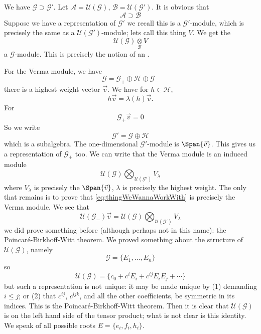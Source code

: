 We have $\mathscr{G}\supset\mathscr{G}'$. Let
$\mathscr{A}=\mathcal{U}(\mathscr{G})$,
$\mathscr{B}=\mathcal{U}(\mathscr{G}')$. It is obvious that
\begin{equation}
\mathscr{A}\supset\mathscr{B}
\end{equation}
Suppose we have a representation of $\mathscr{G}'$ we recall this
is a $\mathscr{G}'$-module, which is precisely the same as a
$\mathcal{U}(\mathscr{G}')$-module; lets call this thing $V$. We
get the
\begin{equation}
\mathcal{U}(\mathscr{G})\mathop{\otimes}\limits_{\mathscr{B}}V
\end{equation}
a $\mathscr{G}$-module. This is precisely the notion of an
.

For the Verma module, we have
\begin{equation}
\mathscr{G}=\mathscr{G}_{+}\oplus\mathscr{H}\oplus\mathscr{G}_{-}
\end{equation}
there is a highest weight vector $\vec{v}$. We have for
$h\in\mathscr{H}$,
\begin{equation}
h\vec{v}=\lambda(h)\vec{v}.
\end{equation}
For
\begin{equation}
\mathscr{G}_{+}\vec{v}=0
\end{equation}
So we write
\begin{equation}
\mathscr{G}'=\mathscr{G}\oplus\mathscr{H}
\end{equation}
which is a subalgebra. The one-dimensional $\mathscr{G}'$-module
is $\Span\{\vec{v}\}$. This gives us a representation of
$\mathscr{G}_{+}$ too. We can write that the Verma module is an
induced module
\begin{equation}\label{eq:thingWeWannaWorkWith}
\mathcal{U}(\mathscr{G})\bigotimes_{\mathcal{U}(\mathscr{G}')}V_{\lambda}
\end{equation}
where $V_{\lambda}$ is precisely the $\Span\{\vec{v}\}$,
$\lambda$ is precisely the highest weight. The only that remains
is to prove that \eqref{eq:thingWeWannaWorkWith} is precisely the
Verma module. We see that
\begin{equation}
\mathcal{U}(\mathscr{G}_{-})\vec{v}=\mathcal{U}(\mathscr{G})\bigotimes_{\mathcal{U}(\mathscr{G}')}V_{\lambda}
\end{equation}
we did prove something before (although perhaps not in this
name): the Poincar\'e-Birkhoff-Witt theorem. We proved something
about the structure of $\mathcal{U}(\mathscr{G})$, namely
\begin{equation}
\mathscr{G}=\{E_{1},\dots,E_{n}\}
\end{equation}
so 
\begin{equation}
\mathcal{U}(\mathscr{G})=\{c_{0}+c^{i}E_{i}+c^{ij}E_{i}E_{j}+\cdots\}
\end{equation}
but such a representation is not unique: it may be made unique by
(1) demanding $i\leq j$; or (2) that $c^{ij}$, $c^{ijk}$, and all
the other coefficients, be symmetric in its indices. This is the
Poincar\'e-Birkhoff-Witt theorem. Then it is clear that
$\mathcal{U}(\mathscr{G})$ is on the left hand side of the tensor
product; what is not clear is this identity. We speak of all
possible roots $E=\{e_{i},f_{i},h_{i}\}$.
